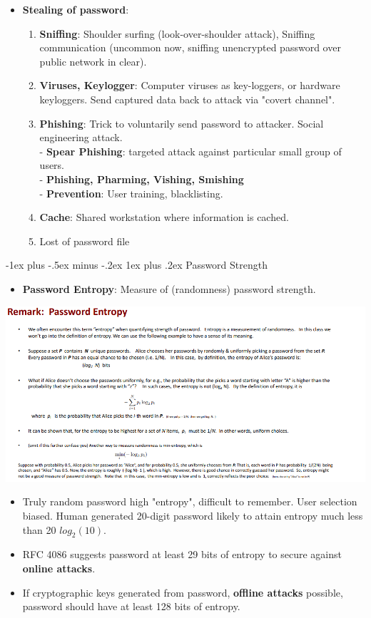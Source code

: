 \documentclass[10pt, landscape]{article}
\makeatletter
\renewcommand{\subsubsection}{\@startsection{subsubsection}{3}{0mm}%
                                {-1ex plus -.5ex minus -.2ex}%
                                {1ex plus .2ex}%
                                {\normalfont\small\bfseries}}
\makeatother
\begin{document}
\begin{multicols*}{3}
\begin{itemize}
\item \textbf{Stealing of password}: 
\begin{enumerate}
\item \textbf{Sniffing}: Shoulder surfing (look-over-shoulder attack), Sniffing communication (uncommon now, sniffing unencrypted password over public network in clear).
\item \textbf{Viruses, Keylogger}: Computer viruses as key-loggers, or hardware keyloggers. Send captured data back to attack via "covert channel".
\item \textbf{Phishing}: Trick to voluntarily send password to attacker. Social engineering attack. \\
- \textbf{Spear Phishing}: targeted attack against particular small group of users. \\
- \textbf{Phishing, Pharming, Vishing, Smishing} \\
- \textbf{Prevention}: User training, blacklisting.
\item \textbf{Cache}: Shared workstation where information is cached.
\item Lost of password file
\end{enumerate}
\end{itemize}

\subsubsection{Password Strength}
\begin{itemize}
\item \textbf{Password Entropy}: Measure of (randomness) password strength. 
\end{itemize}
\centerline{\includegraphics[width=1\linewidth]{passwordEntropy}}
\begin{itemize}
\item Truly random password high "entropy", difficult to remember. User selection biased. Human generated 20-digit password likely to attain 
entropy much less than 20 $log_2(10)$.
\item RFC 4086 suggests password at least 29 bits of entropy to secure against \textbf{online attacks}.
\item If cryptographic keys generated from password, \textbf{offline attacks} possible, password should have at least 128 bits of entropy.
\end{itemize}



\end{multicols*}
\end{document}
